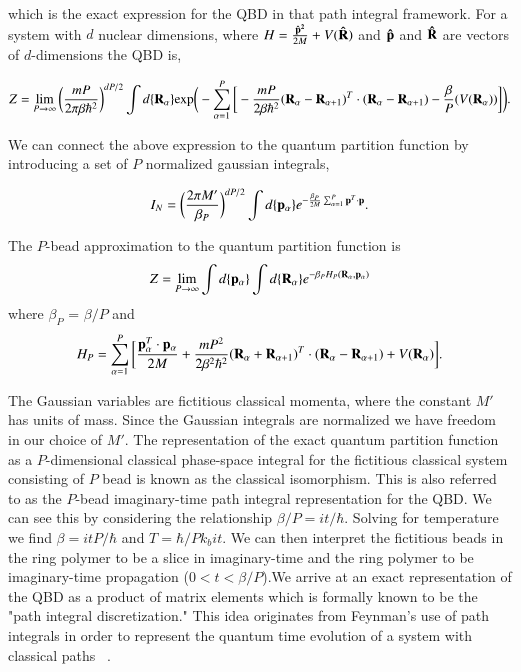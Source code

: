 \documentclass[phd,tocprelim]{cornell}
\begin{document}
which is the exact expression for the QBD in that path integral framework. For a system with $d$ nuclear dimensions, where $H= \frac{\bf{\hat{p}}^2}{2M} + V(\bf{\hat{R}})$ and $\bf{\hat{p}}$ and $\bf{\hat{R}}$ are vectors of $d$-dimensions the QBD is, 

\begin{equation}
Z= \lim_{P \to \infty}\bigg( \frac{mP}{2 \pi \beta {\hbar}^2} \bigg)^{dP/2} \int d\{{\bf{R}}_{\alpha}\} 
\textrm{exp}\bigg(-\sum_{\alpha=1}^P \bigg[-\frac{mP}{2 \beta {\hbar}^2} ( {\bf{R}}_{\alpha} - {{\bf{R}}}_{\alpha+1})^T \cdot  ( {\bf{R}}_{\alpha} - {{\bf{R}}}_{\alpha+1})-\frac{\beta}{P}( V({\bf{R}}_{\alpha})) \bigg] \bigg).
\end{equation}



We can connect the above expression to the quantum partition function by introducing a set of $P$ normalized gaussian integrals,

\begin{equation}
I_N= \bigg( \frac{2 \pi M'}{\beta_P}\bigg)^{dP/2} \int d \{{\bf{p}}_{\alpha} \} e^{-\frac{\beta_P}{2M} \sum_{\alpha=1}^{P} {\bf{p}}^T \cdot  {\bf{p}}}.
\end{equation}


The $P$-bead approximation to the quantum partition function is 
\begin{equation}
Z= \lim_{P \to \infty} \int   d\{{\bf{p}}_{\alpha}\}\int   d\{{\bf{R}}_{\alpha}\}  e^{-\beta_P H_P({\bf{R}}_{\alpha}, {\bf{p}}_{\alpha})}
\end{equation}
where $\beta_P$ = $\beta/P$ and 
\begin{equation}
H_P=\sum_{\alpha=1}^P \bigg[ \frac{{\bf{p}}_{\alpha}^T \cdot {\bf{p}}_{\alpha}}{2M}+\frac{mP^2}{2 \beta^2 {\hbar}^2} ( {\bf{R}}_{\alpha}+  {{\bf{R}}}_{\alpha+1})^T \cdot ( {\bf{R}}_{\alpha} - {{\bf{R}}}_{\alpha+1}) +V({\bf{R}}_{\alpha})\bigg]. 
\end{equation}

The Gaussian variables are fictitious classical momenta, where the constant $M'$  has units of mass. Since the Gaussian integrals are normalized we have freedom in our choice of $M'$. The representation of the exact quantum partition function as a $P$-dimensional classical phase-space integral for the fictitious classical system consisting of $P$ bead is known as the classical isomorphism. This is also referred to as the $P$-bead imaginary-time path integral representation for the QBD. We can see this by considering the relationship $\beta/P = it/\hbar$. Solving for temperature we find $ \beta = itP/\hbar$ and $T= \hbar/P k_b it$. We can then interpret the fictitious beads in the ring polymer to be a slice in imaginary-time and the ring polymer to be imaginary-time propagation ($0<t<\beta/P$).We arrive at an exact representation of the QBD as a product of matrix elements which is formally known to be the "path integral discretization." This idea originates from Feynman's use of path integrals in order to represent the quantum time evolution of a system with classical paths ~\cite{FEYN1965, Parrinello1984,CHANDLER1981, TUCKERMAN1998}. 
\end{document}
